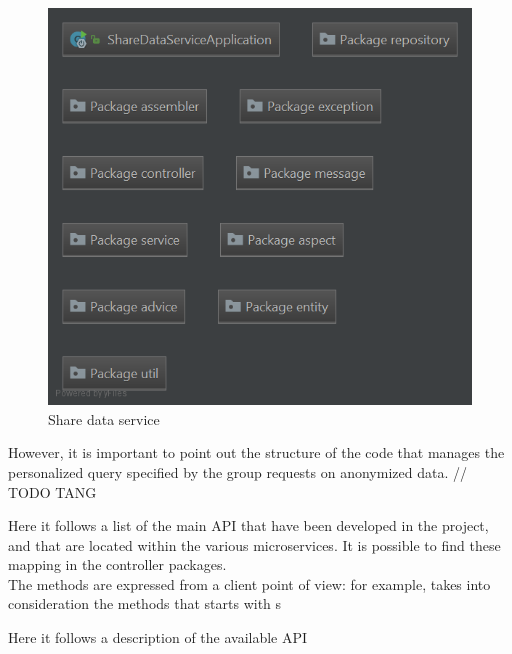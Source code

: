 \begin{figure}[H]
\includegraphics[width=\linewidth]{images/PackageSharedataservice.png}
\caption{ Share data service }
\label{fig:pkgsharedata}
\end{figure}

However, it is important to point out the structure of the code that manages the personalized query specified by the group requests on 
anonymized data. // TODO TANG
  
Here it follows a list of the main API that have been developed in the project, and that are located
within the various microservices.
It is possible to find these mapping in the controller packages. \\
The methods are expressed from a client point of view: for example, takes into consideration the methods that starts with s 

Here it follows a description of the available API

